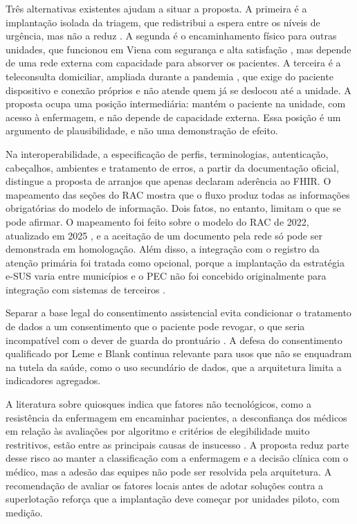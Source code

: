Três alternativas existentes ajudam a situar a proposta. A primeira é a implantação isolada da triagem, que redistribui a espera entre os níveis de urgência, mas não a reduz \cite{stormversloot2014}. A segunda é o encaminhamento físico para outras unidades, que funcionou em Viena com segurança e alta satisfação \cite{sorznechay2025}, mas depende de uma rede externa com capacidade para absorver os pacientes. A terceira é a teleconsulta domiciliar, ampliada durante a pandemia \cite{donida2021}, que exige do paciente dispositivo e conexão próprios e não atende quem já se deslocou até a unidade. A proposta ocupa uma posição intermediária: mantém o paciente na unidade, com acesso à enfermagem, e não depende de capacidade externa. Essa posição é um argumento de plausibilidade, e não uma demonstração de efeito.


Na interoperabilidade, a especificação de perfis, terminologias, autenticação, cabeçalhos, ambientes e tratamento de erros, a partir da documentação oficial, distingue a proposta de arranjos que apenas declaram aderência ao FHIR. O mapeamento das seções do RAC mostra que o fluxo produz todas as informações obrigatórias do modelo de informação. Dois fatos, no entanto, limitam o que se pode afirmar. O mapeamento foi feito sobre o modelo do RAC de 2022, atualizado em 2025 \cite{portaria8347}, e a aceitação de um documento pela rede só pode ser demonstrada em homologação. Além disso, a integração com o registro da atenção primária foi tratada como opcional, porque a implantação da estratégia e-SUS varia entre municípios \cite{cielo2022} e o PEC não foi concebido originalmente para integração com sistemas de terceiros \cite{celuppi2024}.


Separar a base legal do consentimento assistencial evita condicionar o tratamento de dados a um consentimento que o paciente pode revogar, o que seria incompatível com o dever de guarda do prontuário \cite{lgpd2018, lei13787}. A defesa do consentimento qualificado por Leme e Blank \cite{leme2020} continua relevante para usos que não se enquadram na tutela da saúde, como o uso secundário de dados, que a arquitetura limita a indicadores agregados.


A literatura sobre quiosques indica que fatores não tecnológicos, como a resistência da enfermagem em encaminhar pacientes, a desconfiança dos médicos em relação às avaliações por algoritmo e critérios de elegibilidade muito restritivos, estão entre as principais causas de insucesso \cite{joseph2023}. A proposta reduz parte desse risco ao manter a classificação com a enfermagem e a decisão clínica com o médico, mas a adesão das equipes não pode ser resolvida pela arquitetura. A recomendação de avaliar os fatores locais antes de adotar soluções contra a superlotação \cite{pearce2024} reforça que a implantação deve começar por unidades piloto, com medição.

